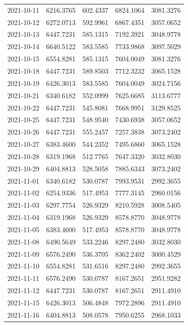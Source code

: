 \begin{footnotesize}
\begin{longtable}{lllll}
2021-10-11 & 6216.3765 & 602.4337 & 6824.1064 & 3081.3276 \\
2021-10-12 & 6272.0713 & 592.9961 & 6867.4351 & 3057.0652 \\
2021-10-13 & 6447.7231 & 585.1315 & 7192.3921 & 3048.9778 \\
2021-10-14 & 6640.5122 & 583.5585 & 7733.9868 & 3097.5029 \\
2021-10-15 & 6554.8281 & 585.1315 & 7604.0049 & 3081.3276 \\
2021-10-18 & 6447.7231 & 589.8503 & 7712.3232 & 3065.1528 \\
2021-10-19 & 6426.3013 & 583.5585 & 7604.0049 & 3024.7156 \\
2021-10-21 & 6340.6182 & 552.0999 & 7625.6685 & 3113.6777 \\
2021-10-22 & 6447.7231 & 545.8081 & 7668.9951 & 3129.8525 \\
2021-10-25 & 6447.7231 & 548.9540 & 7430.6938 & 3057.0652 \\
2021-10-26 & 6447.7231 & 555.2457 & 7257.3838 & 3073.2402 \\
2021-10-27 & 6383.4600 & 544.2352 & 7495.6860 & 3065.1528 \\
2021-10-28 & 6319.1968 & 512.7765 & 7647.3320 & 3032.8030 \\
2021-10-29 & 6404.8813 & 528.5058 & 7885.6343 & 3073.2402 \\
2021-11-01 & 6340.6182 & 530.0787 & 7993.9531 & 2992.3655 \\
2021-11-02 & 6254.9336 & 517.4953 & 7777.3145 & 2960.0156 \\
2021-11-03 & 6297.7754 & 526.9329 & 8210.5928 & 3008.5405 \\
2021-11-04 & 6319.1968 & 526.9329 & 8578.8770 & 3048.9778 \\
2021-11-05 & 6383.4600 & 517.4953 & 8578.8770 & 3048.9778 \\
2021-11-08 & 6490.5649 & 533.2246 & 8297.2480 & 3032.8030 \\
2021-11-09 & 6576.2490 & 536.3705 & 8362.2402 & 3000.4529 \\
2021-11-10 & 6554.8281 & 531.6516 & 8297.2480 & 2992.3655 \\
2021-11-11 & 6576.2490 & 530.0787 & 8167.2651 & 2951.9282 \\
2021-11-12 & 6447.7231 & 530.0787 & 8167.2651 & 2911.4910 \\
2021-11-15 & 6426.3013 & 506.4848 & 7972.2896 & 2911.4910 \\
2021-11-16 & 6404.8813 & 508.0578 & 7950.6255 & 2968.1033 \\

\end{longtable}
\end{footnotesize}
